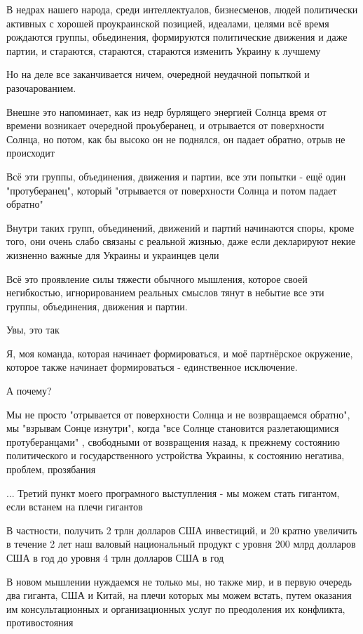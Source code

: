 В недрах нашего народа, среди  интеллектуалов, бизнесменов, людей политически
активных с хорошей проукраинской позицией, идеалами, целями всё время рождаются
группы, обьединения, формируются политические движения и даже партии, и
стараются, стараются, стараются изменить Украину к лучшему

Но на деле все заканчивается ничем, очередной неудачной попыткой и разочарованием.

Внешне это напоминает, как из недр бурлящего энергией Солнца время от времени
возникает очередной проьуберанец, и отрывается от поверхности Солнца, но потом,
как бы высоко он не поднялся, он падает обратно, отрыв не происходит

Всё эти группы, объединения, движения и партии, все эти попытки - ещё один
"протуберанец", который  "отрывается от поверхности Солнца и потом падает
обратно"

Внутри таких групп, объединений, движений и партий начинаются споры, кроме
того, они   очень слабо связаны с реальной жизнью, даже если декларируют некие
жизненно важные для Украины и украинцев цели

Всё это проявление силы тяжести обычного мышления, которое своей негибкостью,
игнорированием реальных смыслов тянут в небытие все эти группы, объединения,
движения и партии.

Увы, это так

Я,  моя команда, которая начинает формироваться, и моё партнёрское окружение,
которое также начинает формироваться - единственное исключение.

А почему?

Мы не просто "отрывается от поверхности Солнца и не возвращаемся обратно", мы
"взрывам Сонце изнутри", когда "все Солнце становится разлетающимися
протуберанцами" , свободными от возвращения назад, к прежнему состоянию
политического и государственного устройства Украины, к состоянию негатива,
проблем, прозябания

... Третий пункт моего програмного выступления - мы можем стать гигантом, если встанем на плечи гигантов

В частности, получить 2 трлн долларов США инвестиций, и 20 кратно увеличить в
течение 2 лет наш валовый национальный продукт с уровня 200 млрд долларов США в
год до уровня 4 трлн долларов США в год

В новом мышлении нуждаемся не только мы, но также мир, и в первую очередь два
гиганта, США и Китай, на плечи которых мы  можем встать, путем оказания им
консультационных и организационных услуг по преодоления их конфликта,
противостояния

